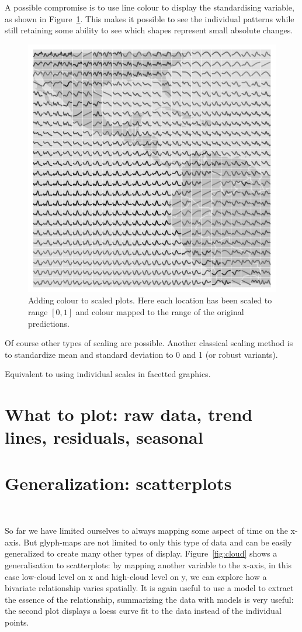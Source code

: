 \documentclass[oneside]{article}
\begin{document}
A possible compromise is to use line colour to display the standardising variable, as shown in Figure~\ref{fig:scaling-col}.  This makes it possible to see the individual patterns while still retaining some ability to see which shapes represent small absolute changes.

\begin{figure}[htbp]
  \centering
  \includegraphics[width=0.33\linewidth]{month-rescale01-col}
  \caption{Adding colour to scaled plots. Here each location has been scaled to range $[0, 1]$ and colour mapped to the range of the original predictions.}
  \label{fig:scaling-col}
\end{figure}

Of course other types of scaling are possible. Another classical scaling method is to standardize mean and standard deviation to 0 and 1 (or robust variants).

Equivalent to using individual scales in facetted graphics. 

\section{What to plot: raw data, trend lines, residuals,  seasonal}

\section{Generalization: scatterplots}~\label{sec:scatter}

So far we have limited ourselves to always mapping some aspect of time on the x-axis. But glyph-maps are not limited to only this type of data and can  be easily generalized to create many other types of display. Figure~\ref{fig:cloud} shows a generalisation to scatterplots: by mapping another variable to the x-axis, in this case low-cloud level on x and high-cloud level on y, we can explore how a bivariate relationship varies spatially. It is again useful to use a model to extract the essence of the relationship, summarizing the data with models is very useful: the second plot displays a loess curve fit to the data instead of the individual points.  
\end{document}
